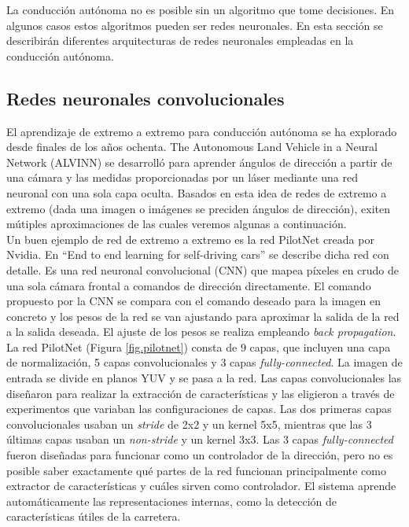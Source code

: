 La conducción autónoma no es posible sin un algoritmo que tome decisiones. En algunos casos estos algoritmos pueden ser redes neuronales. En esta sección se describirán diferentes arquitecturas de redes neuronales empleadas en la conducción autónoma.


\subsection{Redes neuronales convolucionales}

El aprendizaje de extremo a extremo para conducción autónoma se ha explorado desde finales de los años ochenta. The Autonomous Land Vehicle in a Neural Network (ALVINN) \cite{alvinn} se desarrolló para aprender ángulos de dirección a partir de una cámara y las medidas proporcionadas por un láser mediante una red neuronal con una sola capa oculta. Basados en esta idea de redes de extremo a extremo (dada una imagen o imágenes se preciden ángulos de dirección), exiten mútiples aproximaciones \cite{road} \cite{end2end} \cite{interpretable} de las cuales veremos algunas a continuación.\\

Un buen ejemplo de red de extremo a extremo es la red PilotNet \cite{end2end} \cite{explaining-end2end} creada por Nvidia. En ``End to end learning for self-driving cars'' \cite{end2end} se describe dicha red con detalle. Es una red neuronal convolucional (CNN) que mapea píxeles en crudo de una sola cámara frontal a comandos de dirección directamente. El comando propuesto por la CNN se compara con el comando deseado para la imagen en concreto y los pesos de la red se van ajustando para aproximar la salida de la red a la salida deseada. El ajuste de los pesos se realiza empleando \textit{back propagation}.\\

La red PilotNet (Figura \ref{fig.pilotnet}) consta de 9 capas, que incluyen una capa de normalización, 5 capas convolucionales y 3 capas \textit{fully-connected}. La imagen de entrada se divide en planos YUV y se pasa a la red. Las capas convolucionales las diseñaron para realizar la extracción de características y las eligieron a través de experimentos que variaban las configuraciones de capas. Las dos primeras capas convolucionales usaban un \textit{stride} de 2x2 y un kernel 5x5, mientras que las 3 últimas capas usaban un \textit{non-stride} y un kernel 3x3. Las 3 capas \textit{fully-connected} fueron diseñadas para funcionar como un controlador de la dirección, pero no es posible saber exactamente qué partes de la red funcionan principalmente como extractor de características y cuáles sirven como controlador. El sistema aprende automáticamente las representaciones internas, como la detección de características útiles de la carretera.\\

